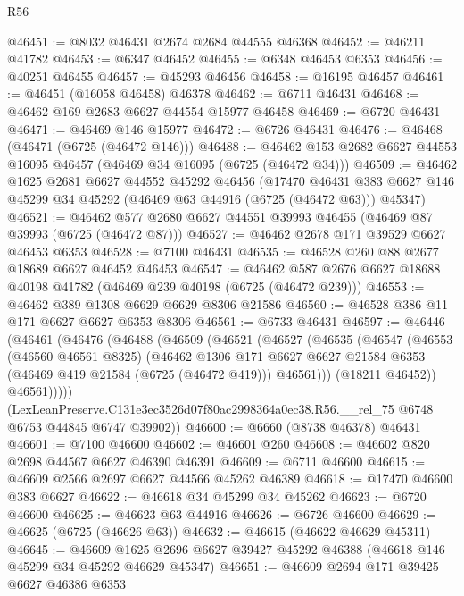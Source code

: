\begin{lexlean}{R56}
\begin{coremodule}
@46451 := @8032 @46431 @2674 @2684 @44555 @46368
@46452 := @46211 @41782
@46453 := @6347 @46452
@46455 := @6348 @46453 @6353
@46456 := @40251 @46455
@46457 := @45293 @46456
@46458 := @16195 @46457
@46461 := @46451 (@16058 @46458) @46378
@46462 := @6711 @46431
@46468 := @46462 @169 @2683 @6627 @44554 @15977 @46458
@46469 := @6720 @46431
@46471 := @46469 @146 @15977
@46472 := @6726 @46431
@46476 := @46468 (@46471 (@6725 (@46472 @146)))
@46488 := @46462 @153 @2682 @6627 @44553 @16095 @46457 (@46469 @34 @16095 (@6725 (@46472 @34)))
@46509 := @46462
    @1625
    @2681
    @6627
    @44552
    @45292
    @46456
    (@17470
      @46431
      @383
      @6627
      @146
      @45299
      @34
      @45292
      (@46469 @63 @44916 (@6725 (@46472 @63)))
      @45347)
@46521 := @46462 @577 @2680 @6627 @44551 @39993 @46455 (@46469 @87 @39993 (@6725 (@46472 @87)))
@46527 := @46462 @2678 @171 @39529 @6627 @46453 @6353
@46528 := @7100 @46431
@46535 := @46528 @260 @88 @2677 @18689 @6627 @46452 @46453
@46547 := @46462 @587 @2676 @6627 @18688 @40198 @41782 (@46469 @239 @40198 (@6725 (@46472 @239)))
@46553 := @46462 @389 @1308 @6629 @6629 @8306 @21586
@46560 := @46528 @386 @11 @171 @6627 @6627 @6353 @8306
@46561 := @6733 @46431
@46597 := @46446
    (@46461
      (@46476
        (@46488
          (@46509
            (@46521
              (@46527
                (@46535
                  (@46547
                    (@46553
                      (@46560 @46561 @8325)
                      (@46462
                        @1306
                        @171
                        @6627
                        @6627
                        @21584
                        @6353
                        (@46469 @419 @21584 (@6725 (@46472 @419)))
                        @46561)))
                  (@18211 @46452))
                @46561)))))
      (LexLeanPreserve.C131e3ec3526d07f80ac2998364a0ec38.R56.__rel_75
        @6748
        @6753
        @44845
        @6747
        @39902))
@46600 := @6660 (@8738 @46378) @46431
@46601 := @7100 @46600
@46602 := @46601 @260
@46608 := @46602 @820 @2698 @44567 @6627 @46390 @46391
@46609 := @6711 @46600
@46615 := @46609 @2566 @2697 @6627 @44566 @45262 @46389
@46618 := @17470 @46600 @383 @6627
@46622 := @46618 @34 @45299 @34 @45262
@46623 := @6720 @46600
@46625 := @46623 @63 @44916
@46626 := @6726 @46600
@46629 := @46625 (@6725 (@46626 @63))
@46632 := @46615 (@46622 @46629 @45311)
@46645 := @46609
    @1625
    @2696
    @6627
    @39427
    @45292
    @46388
    (@46618 @146 @45299 @34 @45292 @46629 @45347)
@46651 := @46609 @2694 @171 @39425 @6627 @46386 @6353

\end{coremodule}
\end{lexlean}
